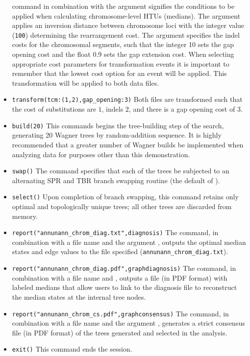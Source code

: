 \begin{itemize}
command in combination with the argument  signifies the conditions to be applied when calculating 
chromosome-level HTUs (medians).  The argument  applies an inversion distance 
between chromosome loci with the integer value (\texttt{100}) determining the rearrangement cost. The argument 
 specifies the indel costs for the chromosomal segments, such that the integer 10 
sets the gap opening cost and the float 0.9 sets the gap extension cost.  When selecting appropriate cost parameters
for transformation events it is important to remember that the lowest cost option for an event will be applied. This 
transformation will be applied to both data files.  
\item \texttt{transform(tcm:(1,2),gap\_opening:3)} Both files are transformed such that the cost of 
substitutions are $1$, indels $2$, and there is a gap opening cost of $3$.
\item \texttt{build(20)} This commands begins the tree-building step of the search, generating 20 Wagner trees by 
random-addition sequence.  It is highly recommended that a greater number of Wagner builds be implemented 
when analyzing data for purposes other than this demonstration.
\item \texttt{swap()} The  command specifies that each of the trees be subjected to an alternating 
SPR and TBR branch swapping routine (the default of \poy).
\item \texttt{select()} Upon completion of branch swapping, this command retains only optimal and topologically 
unique trees; all other trees are discarded from memory. 
\item \texttt{report("annunann\_chrom\_diag.txt",diagnosis)} The  command, in combination 
with a file name and the argument , outputs the optimal median states and edge values to the file specified 
(\texttt{annunann\_chrom\_diag.txt}). 
\item \texttt{report("annunann\_chrom\_diag.pdf",graphdiagnosis)} The  command, in combination 
with a file name and  , outputs a file (in PDF format) with labeled 
medians that allow users to link to the diagnosis file to reconstruct the median states at the internal tree nodes.
\item \texttt{report("annunann\_chrom\_cs.pdf",graphconsensus)}  The  command, in combination with a file 
name and the argument , generates a strict consensus file (in PDF format) of the trees generated 
and selected in the analysis.
\item \texttt{exit()} This command ends the \poy session.
\end{itemize}

